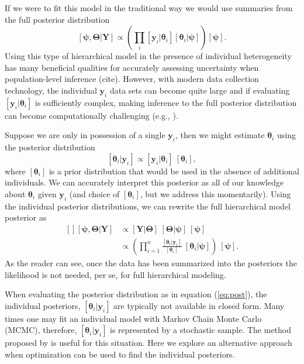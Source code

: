 \documentclass[12pt]{article}
\newcommand{\by}{\mathbf{y}}
\newcommand{\bt}{\boldsymbol{\theta}}
\newcommand{\bT}{\boldsymbol{\Theta}}
\newcommand{\bp}{\boldsymbol{\psi}}
\newcommand{\bY}{\mathbf{Y}}
\begin{document}
If we were to fit this model in the traditional way we would use summaries from the full posterior distribution 
\[
[\bp, \bT|\bY] \propto \left(\prod_i[\by_i|\bt_i][\bt_i|\bp]\right) [\bp].
\]
Using this type of hierarchical model in the presence of individual heterogeneity has many beneficial qualities for accurately assessing uncertainty when population-level inference (cite). However, with modern data collection technology, the individual $\by_i$ data sets can become quite large and if evaluating $[\by_i|\bt_i]$ is sufficiently complex, making inference to the full posterior distribution can become computationally challenging (e.g., \citealt{hooten2016hierarchical}).

Suppose we are only in possession of a single $\by_i$, then we might estimate $\bt_i$ using the posterior distribution
\[
[\bt_i|\by_i] \propto [\by_i|\bt_i]\ [\bt_i],
\]
where $[\bt_i]$ is a prior distribution that would be used in the absence of additional individuals. We can accurately interpret this posterior as all of our knowledge about $\bt_i$ given $\by_i$ (and choice of $[\bt_i]$, but we address this momentarily). Using the individual posterior distributions, we can rewrite the full hierarchical model posterior as 
\begin{equation}
\label{eq:post}
\begin{aligned}[]
[\bp,\bT|\bY] &\propto [\bY|\bT]\ [\bT|\bp]\ [\bp]\\
& \propto \left(\prod_{i=1}^n\frac{[\bt_i|\by_i]}{[\bt_i]}\ [\bt_i|\bp]\right)\ [\bp].
\end{aligned}
\end{equation}
As the reader can see, once the data has been summarized into the posteriors the likelihood is not needed, per se, for full hierarchical modeling. 

When evaluating the posterior distribution as in equation (\ref{eq:post}), the individual posteriors, $[\bt_i|\by_i]$ are typically not available in closed form. Many times one may fit an individual model with Markov Chain Monte Carlo (MCMC), therefore, $[\bt_i|\by_i]$ is represented by a stochastic sample. The method proposed by \citet{lunn2013fully} is useful for this situation. Here we explore an alternative approach when optimization can be used to find the individual posteriors.
\end{document}
